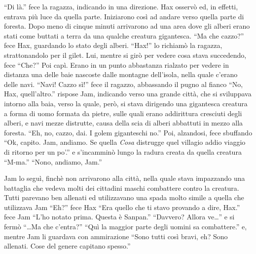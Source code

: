     ``Di là.'' fece la ragazza, indicando in una direzione. Hax osservò ed,
    in effetti, entrava più luce da quella parte. Iniziarono così ad andare
    verso quella parte di foresta. Dopo meno di cinque minuti arrivarono ad
    una area dove gli alberi erano stati come buttati a terra da una
    qualche creatura gigantesca. ``Ma che cazzo?'' fece Hax, guardando lo
    stato degli alberi. ``Hax!'' lo richiamò la ragazza, strattonandolo per
    il gilet. Lui, mentre si girò per vedere cosa stava succedendo, fece
    ``Che?'' Poi capì. Erano in un punto abbastanza rialzato per vedere in
    distanza una delle baie nascoste dalle montagne dell'isola, nella quale
    c'erano delle navi. ``Navi! Cazzo sì!'' fece il ragazzo, abbassando il
    pugno al fianco ``No, Hax, quell'altro.'' rispose Jam, indicando verso
    una grande città, che si sviluppava intorno alla baia, verso la quale,
    però, si stava dirigendo una gigantesca creatura a forma di uomo
    formata da pietre, sulle quali erano addirittura cresciuti degli
    alberi, e navi mezze distrutte, causa della scia di
    alberi abbattuti in mezzo alla foresta. ``Eh, no, cazzo, dai. I golem
    giganteschi no.'' Poi, alzandosi, fece sbuffando ``Ok, capito. Jam,
    andiamo. Se quella \emph{Cosa} distrugge quel villagio addio viaggio di
    ritorno per un po'.'' e s'incamminò lungo la radura creata da quella
    creatura ``M-ma.'' ``Nono, andiamo, Jam.''

    Jam lo seguì, finchè non arrivarono alla città, nella quale stava
    impazzando una battaglia che vedeva molti dei cittadini maschi
    combattere contro la creatura. Tutti parevano ben allenati ed
    utilizzavano una spada molto simile a quella che utilizzava Jam ``Eh?''
    fece Hax ``Era quello che ti stavo provando a dire, Hax.'' fece Jam
    ``L'ho notato prima. Questa è Sanpan.'' ``Davvero? Allora ve\dots{}'' e
    si fermò ``\dots{}Ma che c'entra?'' ``Quì la maggior parte degli uomini
    sa combattere.'' e, mentre Jam li guardava con ammirazione ``Sono tutti
    così bravi, eh? Sono allenati. Cose del genere capitano spesso.''

